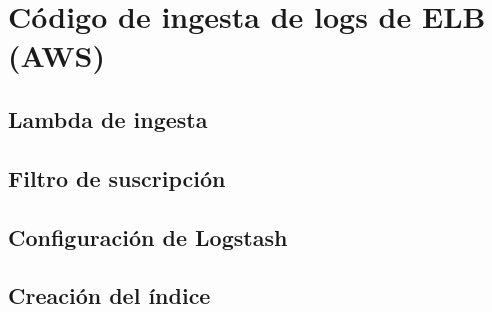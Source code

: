 \chapter{Código de ingesta de logs de ELB (AWS)}\label{anexo:elb}
\section{Lambda de ingesta}


\newpage{}
\section{Filtro de suscripción}


\newpage{}
\section{Configuración de Logstash}


\newpage{}
\section{Creación del índice}

